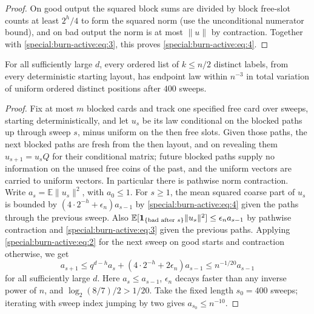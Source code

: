 \begin{proof}
On good output the squared block sums are divided by block free-slot counts at least \(2^h/4\) to form the squared norm (use the unconditional numerator bound), and on bad output the norm is at most \(\|u\|\) by contraction. Together with \eqref{special:burn-active:eq:3}, this proves \eqref{special:burn-active:eq:4}.

\end{proof}

\begin{proposition}\label{prop:half-preparation}
For all sufficiently large $d$, every ordered list of $k\le n/2$ distinct labels, from every deterministic starting layout, has endpoint law within $n^{-3}$ in total variation of uniform ordered distinct positions after $400$ sweeps.
\end{proposition}
\begin{proof}
Fix at most $m$ blocked cards and track one specified free card over sweeps, starting deterministically, and let \(u_s\) be its law conditional on the blocked paths up through sweep \(s\), minus uniform on the then free slots. Given those paths, the next blocked paths are fresh from the then layout, and on revealing them \(u_{s+1}=u_s Q\) for their conditional matrix; future blocked paths supply no information on the unused free coins of the past, and the uniform vectors are carried to uniform vectors. In particular there is pathwise norm contraction. Write \(a_s=\mathbb E\|u_s\|^2\), with \(a_0\le1\). For \(s\ge1\), the mean squared coarse part of \(u_s\) is bounded by \((4\cdot 2^{-h}+\epsilon_n)a_{s-1}\) by \eqref{special:burn-active:eq:4} given the paths through the previous sweep. Also \(\mathbb E[{\bf 1}_{\{\text{bad after }s\}}\|u_s\|^2]\le\epsilon_n a_{s-1}\) by pathwise contraction and \eqref{special:burn-active:eq:3} given the previous paths. Applying \eqref{special:burn-active:eq:2} for the next sweep on good starts and contraction otherwise, we get
\[
 a_{s+1}\le q^{d-h}a_s+(4\cdot 2^{-h}+2\epsilon_n)a_{s-1}
 \le n^{-1/20} a_{s-1}
\]
for all sufficiently large \(d\). Here \(a_s\le a_{s-1}\), \(\epsilon_n\) decays faster than any inverse power of \(n\), and \(\log_2(8/7)/2>1/20\). Take the fixed length \(s_0=400\) sweeps; iterating with sweep index jumping by two gives \(a_{s_0}\le n^{-10}\).


\end{proof}
